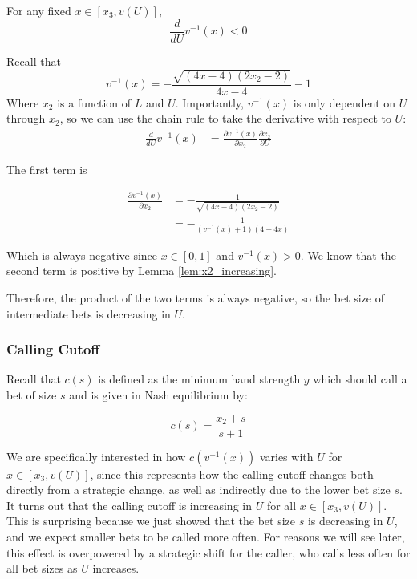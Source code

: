 \documentclass[../../main/main.tex]{subfiles}
\begin{document}
\begin{lemma}
    \label{lem:v_inverse_decreasing}
    For any fixed $x \in [x_3, v(U)]$, 
    \[ 
        \frac{d}{dU} v^{-1}(x) < 0
    \]
\end{lemma}

\begin{customproof}
    Recall that 
    $$v^{-1}(x) = -\frac{\sqrt{(4 x-4) (2 x_2-2)}}{4 x-4}-1$$
    Where $x_2$ is a function of $L$ and $U$. Importantly, $v^{-1}(x)$ is only dependent on $U$ through $x_2$, so we can use the chain rule to take the derivative with respect to $U$:
    \begin{align*}
        \frac{d}{dU} v^{-1}(x) & = \frac{\partial v^{-1}(x)}{\partial x_2} \frac{\partial x_2}{\partial U}
    \end{align*}

    The first term is 

\begin{align*}
    \frac{\partial v^{-1}(x)}{\partial x_2} & = - \frac{1}{\sqrt{(4 x-4) (2 x_2-2)}} \\
    &= - \frac{1}{(v^{-1}(x)+1)(4-4x)}
\end{align*}

    Which is always negative since $x \in [0, 1]$ and $v^{-1}(x) >0 $. We know that the second term is positive by Lemma \ref{lem:x2_increasing}.

    Therefore, the product of the two terms is always negative, so the bet size of intermediate bets is decreasing in $U$.
\end{customproof}

\subsubsection{Calling Cutoff}

Recall that $c(s)$ is defined as the minimum hand strength $y$ which should call a bet of size $s$ and is given in Nash equilibrium by:

$$c(s) = \frac{x_2 + s}{s+1}$$

We are specifically interested in how $c(v^{-1}(x))$ varies with $U$ for $x \in [x_3, v(U)]$, since this represents how the calling cutoff changes both directly from a strategic change, as well as indirectly due to the lower bet size $s$. It turns out that the calling cutoff is increasing in $U$ for all $x \in [x_3, v(U)]$. This is surprising because we just showed that the bet size $s$ is decreasing in $U$, and we expect smaller bets to be called more often. For reasons we will see later, this effect is overpowered by a strategic shift for the caller, who calls less often for all bet sizes as $U$ increases. 
\end{document}
